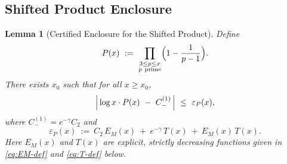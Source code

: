 \documentclass[11pt]{article}
\theoremstyle{inline}
\theoremstyle{break}
\newtheorem{lemma}{Lemma}
\theoremstyle{break}
\theoremstyle{break}
\theoremstyle{break}
\theoremstyle{break}
\theoremstyle{break}
\theoremstyle{break}
\theoremstyle{inline}
\begin{document}
\subsection{Shifted Product Enclosure}\label{app:shifted-product}

\begin{lemma}[Certified Enclosure for the Shifted Product]\label{lem:shifted-enclosure}
Define
\begin{equation}\label{eq:P-def}
P(x)\ :=\ \prod_{\substack{3\le p\le x\\ p\ \mathrm{prime}}}\Bigl(1-\frac{1}{p-1}\Bigr).
\end{equation}
There exists \(x_0\) such that for all \(x\ge x_0\),
\begin{equation}\label{eq:shifted-enclosure}
\Bigl|\,\log x\cdot P(x)\ -\ C_-^{(1)}\,\Bigr|\ \le\ \varepsilon_P(x),
\end{equation}
where \(C_-^{(1)}=e^{-\gamma}C_2\) and
\begin{equation}\label{eq:epsP-def}
\varepsilon_P(x)\ :=\ C_2\,E_M(x)\ +\ e^{-\gamma}\,T(x)\ +\ E_M(x)\,T(x).
\end{equation}
Here \(E_M(x)\) and \(T(x)\) are explicit, strictly decreasing functions given in
\eqref{eq:EM-def} and \eqref{eq:T-def} below.
\end{lemma}
\end{document}
